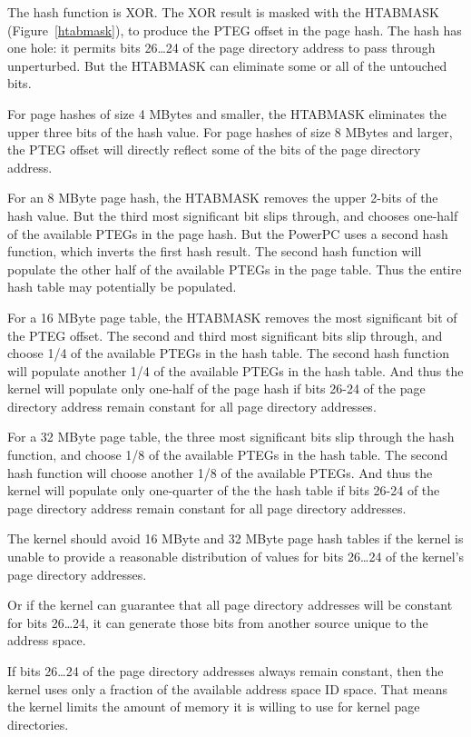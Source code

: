 \documentclass[a4paper]{article}
\begin{document}
The hash function is XOR.  The XOR result is masked with the 
HTABMASK (Figure~\ref{htabmask}), to produce the PTEG offset in the page hash.
The hash has one hole: it permits bits 26\dots 24 of the page directory address 
to pass through unperturbed.  But the HTABMASK can eliminate some or all 
of the untouched bits.

For page hashes of size 4 MBytes and smaller, the HTABMASK eliminates the upper
three bits of the hash value.
For page hashes of size 8 MBytes and larger, the PTEG offset will directly
reflect some of the bits of the page directory address.

For an 8 MByte page hash, the HTABMASK removes the upper 2-bits of the hash 
value.  But the third most significant bit slips through, and chooses
one-half of the available PTEGs in the page hash.  But the PowerPC uses
a second hash function, which inverts the first hash result.  The 
second hash function will populate the other half of the available PTEGs in the
page table.  Thus the entire hash table may potentially be populated.

For a 16 MByte page table, the HTABMASK removes the most significant bit of 
the PTEG offset.  The second and third most significant bits slip
through, and choose 1/4 of the available PTEGs in the hash table.  The
second hash function will populate another 1/4 of the available PTEGs in the
hash table.  And thus the kernel will populate only one-half of the page hash
if bits 26-24 of the page directory address remain constant for all page 
directory addresses.

For a 32 MByte page table, the three most significant bits slip through the
hash function, and choose 1/8 of the available PTEGs in the hash table.  
The second hash function will choose another 1/8 of the available PTEGs.  And 
thus the kernel will populate only one-quarter
of the the hash table if bits 26-24 of the
page directory address remain constant for all page directory addresses.

The kernel should avoid 16 MByte and 32 MByte page hash tables if the kernel
is unable to provide a reasonable distribution of values for bits 26\dots 24
of the kernel's page directory addresses.

Or if the kernel can guarantee that all page directory addresses will be 
constant for bits 26\dots 24, it can generate those bits from another source 
unique to the address space.  

If bits 26\dots 24 of the page directory addresses
always remain constant, then the kernel uses only a fraction of the
available address space ID space.  That means the kernel limits
the amount of memory it is willing to use for kernel
page directories.
\end{document}
